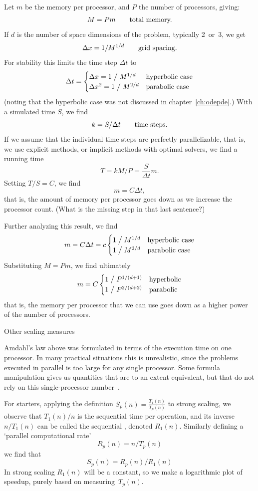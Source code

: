 Let $m$ be the memory per processor, and $P$ the number of processors, giving:
\[ M=Pm\qquad\hbox{total memory.} \]
If $d$ is the number of space dimensions of the problem, typically 2~or~3,
we get
\[ \Delta x = 1/M^{1/d}\qquad\hbox{grid spacing.} \]
For stability this limits the time step $\Delta t$ to
\[ \Delta t=
\begin{cases}
\Delta x=1\bigm/M^{1/d}&\hbox{hyperbolic case}\\
\Delta x^2=1\bigm/M^{2/d}&\hbox{parabolic case}
\end{cases}
\]
(noting that the hyperbolic case was not discussed in chapter~\ref{ch:odepde}.)
With a simulated time $S$, we find
\[ k=S/\Delta t\qquad \hbox{time steps.} \]
If we assume that the individual time steps are perfectly parallelizable,
that is, we use explicit methods, or implicit methods with optimal solvers,
we find a running time
\[ T=kM/P=\frac{S}{\Delta t}m. \]
Setting $T/S=C$, we find
\[ m=C\Delta t, \]
that is, the amount of memory per processor goes down as we increase the processor
count. (What is the missing step in that last sentence?)

Further analyzing this result, we find
\[ m=C\Delta t = c
\begin{cases}
1\bigm/M^{1/d}&\hbox{hyperbolic case}\\
1\bigm/M^{2/d}&\hbox{parabolic case}
\end{cases}
\]
Substituting $M=Pm$, we find ultimately
\[ m = C
\begin{cases}
1\bigm/P^{1/(d+1)}&\hbox{hyperbolic}\\
1\bigm/P^{2/(d+2)}&\hbox{parabolic}
\end{cases}
\]
that is, the memory per processor that we can use
goes down as a higher power of the number of processors.

 {Other scaling measures}

Amdahl's law above was formulated in terms of the execution time on
one processor. In many practical situations this is unrealistic, since
the problems executed in parallel is too large for any single
processor.  Some formula manipulation gives us quantities that are to
an extent equivalent, but that do not rely on this single-processor
number~\cite{Moreland:formalmetrics2015}.

For starters, applying the definition
%
$S_p(n) = \frac{ T_1(n) }{ T_p(n) }$
%
to strong scaling, we observe that $T_1(n)/n$ is the sequential time
per operation, and its inverse $n/T_1(n)$ can be called the sequential
, denoted $R_1(n)$. Similarly
defining a `parallel computational rate'
\begin{equation}
  R_p(n) = n/T_p(n)
\end{equation}
we find that
\[ S_p(n) = R_p(n)/R_1(n) \]
In strong scaling $R_1(n)$ will be a constant, so we
make a logarithmic plot of speedup, purely based on measuring~$T_p(n)$.

